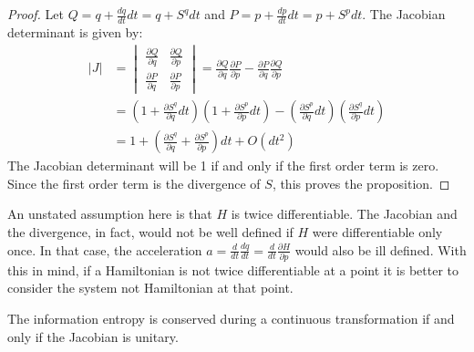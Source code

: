 \documentclass[10pt,twocolumn, nofootinbib]{revtex4-2}
\begin{document}
\begin{proof}
	Let $Q = q + \frac{dq}{dt} dt = q + S^q dt$ and $P = p + \frac{dp}{dt} dt = p + S^p dt$. The Jacobian determinant is given by:
	\begin{align*}
		|J| &= \begin{vmatrix}
			\frac{\partial Q}{\partial q} & \frac{\partial Q}{\partial p} \\
			\frac{\partial P}{\partial q} & \frac{\partial P}{\partial  p} 
		\end{vmatrix} = \frac{\partial Q}{\partial q} \frac{\partial P}{\partial  p} - \frac{\partial P}{\partial q} \frac{\partial Q}{\partial p} \\
		&= \left(1 + \frac{\partial S^q}{\partial  q}dt\right)\left(1 + \frac{\partial S^p}{\partial  p}dt\right) - \left(\frac{\partial S^p}{\partial  q}dt\right)\left(\frac{\partial S^q}{\partial  p}dt\right) \\
		&= 1 + \left(\frac{\partial S^q}{\partial  q} + \frac{\partial S^p}{\partial  p}\right)dt + O(dt^2)
	\end{align*}
	The Jacobian determinant will be 1 if and only if the first order term is zero. Since the first order term is the divergence of $S$, this proves the proposition.	
\end{proof}

\begin{remark}
	An unstated assumption here is that $H$ is twice differentiable. The Jacobian and the divergence, in fact, would not be well defined if $H$ were differentiable only once. In that case, the acceleration $a = \frac{d}{dt}\frac{dq}{dt} = \frac{d}{dt} \frac{\partial H}{\partial p}$ would also be ill defined. With this in mind, if a Hamiltonian is not twice differentiable at a point it is better to consider the system not Hamiltonian at that point.
\end{remark}

\begin{prop}
	The information entropy is conserved during a continuous transformation if and only if the Jacobian is unitary.
\end{prop}
\end{document}
